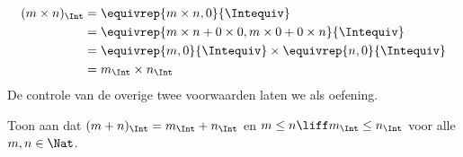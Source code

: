\documentclass[openany]{memoir}
\begin{document}
	\begin{align*}
		(m \times n)_\Int  &= \equivrep{m \times n, 0}{\Intequiv} \\
		&= \equivrep{m \times n + 0 \times 0, m \times 0 + 0 \times n}{\Intequiv} \\
		&= \equivrep{m, 0}{\Intequiv} \times \equivrep{n, 0}{\Intequiv} \\
		&= m_\Int \times n_\Int
	\end{align*}
De controle van de overige twee voorwaarden laten we als oefening.
\begin{prob}
	Toon aan dat $(m + n)_\Int = m_\Int + n_\Int$ en $m \leq n \liff
	m_\Int \leq n_\Int$ voor alle $m, n \in \Nat$.
\end{prob}
\endgroup

\begingroup
\def\olfilename{OLP-0043}
\def\olfilepath{content/sets-functions-relations/arithmetization/}
\hypertarget{unit-OLP-0043}{}
\end{document}
